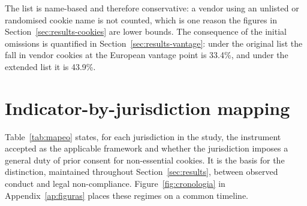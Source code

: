 \documentclass[pdflatex,sn-basic,Numbered,iicol]{sn-jnl}
\theoremstyle{thmstyleone}
\theoremstyle{thmstyletwo}
\theoremstyle{thmstylethree}
\begin{document}
\begin{appendices}
		The list is name-based and therefore conservative: a vendor using an unlisted or randomised cookie name is not counted, which is one reason the figures in Section~\ref{sec:results-cookies} are lower bounds. The consequence of the initial omissions is quantified in Section~\ref{sec:results-vantage}: under the original list the fall in vendor cookies at the European vantage point is 33.4\%, and under the extended list it is 43.9\%.
		
		\section{Indicator-by-jurisdiction mapping}\label{ap:mapeo}
		\setcounter{table}{0}\setcounter{figure}{0}
		
		Table~\ref{tab:mapeo} states, for each jurisdiction in the study, the instrument accepted as the applicable framework and whether the jurisdiction imposes a general duty of prior consent for non-essential cookies. It is the basis for the distinction, maintained throughout Section~\ref{sec:results}, between observed conduct and legal non-compliance. Figure~\ref{fig:cronologia} in Appendix~\ref{ap:figuras} places these regimes on a common timeline.
		

\end{appendices}
\end{document}
